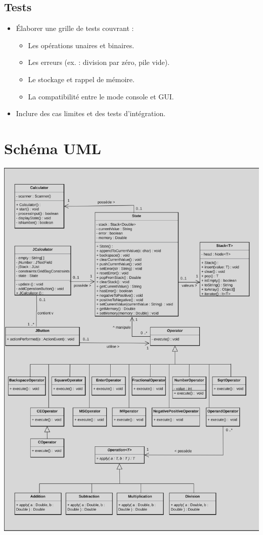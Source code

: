 \documentclass[12pt]{report}
\begin{document}
            \subsection*{Tests}
                \begin{itemize}
                    \item Élaborer une grille de tests couvrant :
                    \begin{itemize}
                        \item Les opérations unaires et binaires.
                        \item Les erreurs (ex. : division par zéro, pile vide).
                        \item Le stockage et rappel de mémoire.
                        \item La compatibilité entre le mode console et GUI.
                    \end{itemize}

                    \item Inclure des cas limites et des tests d'intégration.
                \end{itemize}

    \section*{Schéma UML}
    \includegraphics[scale=0.3]{images/diagram}
\end{document}
